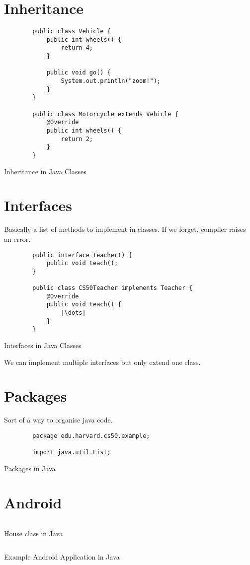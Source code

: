 \clearpage
\section{Inheritance}
\begin{code}
	\begin{verbatim}
		public class Vehicle {
			public int wheels() {
				return 4;
			}

			public void go() {
				System.out.println("zoom!");
			}
		}

		public class Motorcycle extends Vehicle {
			@Override
			public int wheels() {
				return 2;
			}
		}
	\end{verbatim}
	\caption{Inheritance in Java Classes}
\end{code}

\section{Interfaces}
Basically a list of methods to implement in classes. If we forget, compiler raises
an error.
\begin{code}
	\begin{verbatim}
		public interface Teacher() {
			public void teach();
		}

		public class CS50Teacher implements Teacher {
			@Override
			public void teach() {
				|\dots|
			}
		}
	\end{verbatim}
	\caption{Interfaces in Java Classes}
\end{code}

\begin{remark}
	We can implement multiple interfaces but only extend one class.
\end{remark}

\section{Packages}
Sort of a way to organise java code.
\begin{code}
	\begin{verbatim}
		package edu.harvard.cs50.example;

		import java.util.List; 
	\end{verbatim}
	\caption{Packages in Java}
\end{code}

\section{Android}
\begin{code}
	\inputminted{java}{codes/android/javaexample/app/src/main/java/com/example/javaexample/House.java}
	\caption{House class in Java}
\end{code}
\pagebreak
\begin{code}
	\inputminted{java}{codes/android/javaexample/app/src/main/java/com/example/javaexample/MainActivity.java}
	\caption{Example Android Application in Java}
\end{code}